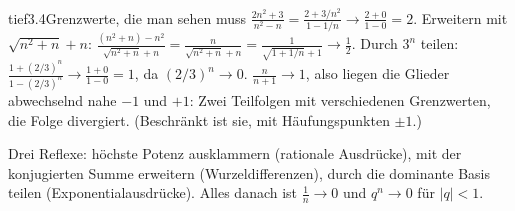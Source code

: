\begin{loesungkarte}{tief}{3.4}{Grenzwerte, die man sehen muss}
$\frac{2n^{2} + 3}{n^{2} - n} = \frac{2 + 3/n^{2}}{1 - 1/n}\to\frac{2 + 0}{1 - 0} = 2$.
Erweitern mit $\sqrt{n^{2} + n} + n$: $\frac{(n^{2} + n) - n^{2}}{\sqrt{n^{2} + n} + n} = \frac n{\sqrt{n^{2} + n} + n} = \frac1{\sqrt{1 + 1/n} + 1}\to\frac12$.
Durch $3^{n}$ teilen: $\frac{1 + (2/3)^{n}}{1 - (2/3)^{n}}\to\frac{1 + 0}{1 - 0} = 1$, da $(2/3)^{n}\to0$.
$\frac n{n + 1}\to1$, also liegen die Glieder abwechselnd nahe $-1$ und $+1$: Zwei Teilfolgen mit verschiedenen Grenzwerten, die Folge divergiert. (Beschränkt ist sie, mit Häufungspunkten $\pm1$.)
\begin{mitnehmen}\kastentext
Drei Reflexe: höchste Potenz ausklammern (rationale Ausdrücke), mit der konjugierten Summe erweitern (Wurzeldifferenzen), durch die dominante Basis teilen (Exponentialausdrücke). Alles danach ist $\frac1n\to0$ und $q^{n}\to0$ für $|q| < 1$.
\end{mitnehmen}
\end{loesungkarte}

